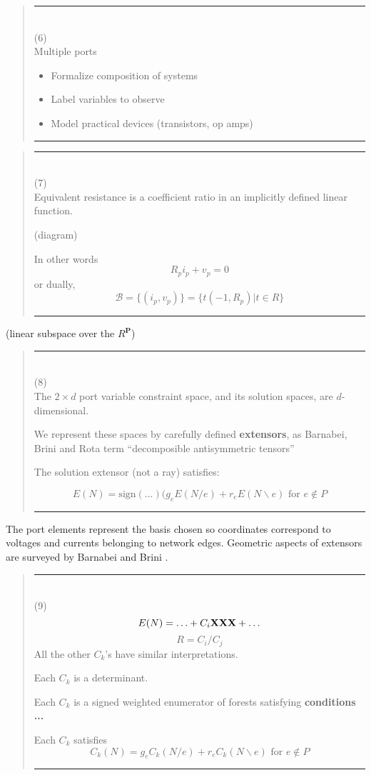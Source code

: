 \documentclass{article}
\begin{document}
\pagebreak[3] \begin{quote}\rule{\textwidth}{3pt}\\
(6)\\
Multiple ports

\begin{itemize}
\item
Formalize composition of systems
\item
Label variables to observe
\item
Model practical devices (transistors, op amps)
\end{itemize}

\rule{\textwidth}{3pt}
\end{quote}

\pagebreak[3] \begin{quote}\rule{\textwidth}{3pt}\\
(7)\\
Equivalent resistance is a coefficient ratio in an 
implicitly defined linear function.

(diagram)

In other words
\[
R_pi_p + v_p = 0
\]
or dually,
\[
\mathcal{B} = \{(i_p,v_p)\}
= \{ t(-1, R_p) | t\in R\}
\]

\rule{\textwidth}{3pt}
\end{quote}

(linear subspace over the $R^{\mathbf{P}}$)

\pagebreak[3] \begin{quote}\rule{\textwidth}{3pt}\\
(8)\\
The $2\times d$ port variable constraint space, 
and its solution spaces, are $d$-dimensional.

We represent these spaces by carefully defined
\textbf{extensors}, as Barnabei, Brini and Rota \cite{exteriorCalc}
term ``decomposible antisymmetric tensors''

The solution extensor (not a ray) satisfies:

\[
E(N) = \text{sign}(...)(g_e E(N/e) + r_e E(N\backslash e)
\text{\ for\ }e\not\in P
\]

\rule{\textwidth}{3pt}
\end{quote}

The port elements represent the basis chosen so coordinates correspond
to voltages and currents belonging to network edges.  Geometric aspects
of extensors are surveyed by 
Barnabei and Brini \cite{exteriorCalc}.

\pagebreak[3] \begin{quote}\rule{\textwidth}{3pt}\\
(9)\\
\[
E(N) = \ldots + C_i\mbox{\bf XXX} + \ldots
\]
\[
R = C_i/C_j
\]
All the other $C_k$'s have similar interpretations.

Each $C_k$ is a determinant.

Each $C_k$ is a signed weighted enumerator of
forests satisfying \textbf{conditions ...}

Each $C_k$ satisfies
\[
C_k(N) = g_e C_k(N/e) + r_e C_k(N\backslash e)
\text{\ for\ }e\not\in {P}
\]

\rule{\textwidth}{3pt}
\end{quote}
\end{document}
